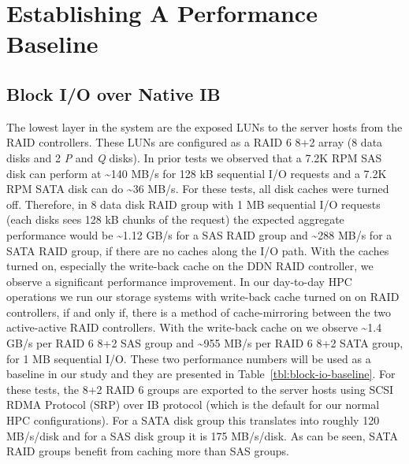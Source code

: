 \section{Establishing A Performance Baseline}
\label{sec:baseline}

\subsection{Block I/O over Native IB} 
\label{sec:block-io}

The lowest layer in the system are the exposed LUNs to the server hosts from
the RAID controllers.  These LUNs are configured as a RAID 6 8+2 array (8 data
disks and 2 \textit{P} and \textit{Q} disks). In prior tests we observed
that a 7.2K RPM SAS disk can perform at \textasciitilde140 MB/s for 128 kB
sequential I/O requests and a 7.2K RPM SATA disk can do \textasciitilde36 MB/s.
For these tests, all disk caches were turned off. Therefore, in 8 data disk
RAID group with 1 MB sequential I/O requests (each disks sees 128 kB chunks of
the request) the expected aggregate performance would be \textasciitilde1.12
GB/s for a SAS RAID group and \textasciitilde288 MB/s for a SATA RAID group, if
there are no caches along the I/O path.  With the caches turned on, especially
the write-back cache on the DDN RAID controller, we observe a significant
performance improvement. In our day-to-day HPC operations we run our storage
systems with write-back cache turned on on RAID controllers, if and only if,
there is a method of cache-mirroring between the two active-active RAID
controllers. With the write-back cache on we observe \textasciitilde1.4 GB/s
per RAID 6 8+2 SAS group and  \textasciitilde955 MB/s per RAID 6 8+2 SATA
group, for 1 MB sequential I/O.  These two performance numbers will be used as
a baseline in our study and they are presented in
Table~\ref{tbl:block-io-baseline}.  For these tests, the 8+2 RAID 6 groups are
exported to the server hosts using SCSI RDMA Protocol (SRP) over IB protocol
(which is the default for our normal HPC configurations). For a SATA disk group
this translates into roughly 120 MB/s/disk and for a SAS disk group it is 175
MB/s/disk. As can be seen, SATA RAID groups benefit from caching more than SAS
groups. 


